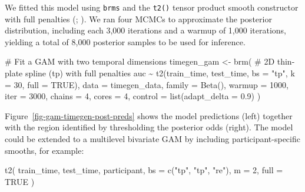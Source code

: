 \documentclass[
  doc,
  floatsintext,
  longtable,
  a4paper,
  nolmodern,
  notxfonts,
  notimes,
  colorlinks=true,linkcolor=blue,citecolor=blue,urlcolor=blue]{apa7}
\newenvironment{Shaded}{\begin{snugshade}}{\end{snugshade}}
\newcommand{\AttributeTok}[1]{\textcolor[rgb]{0.40,0.45,0.13}{#1}}
\newcommand{\CommentTok}[1]{\textcolor[rgb]{0.37,0.37,0.37}{#1}}
\newcommand{\ConstantTok}[1]{\textcolor[rgb]{0.56,0.35,0.01}{#1}}
\newcommand{\DecValTok}[1]{\textcolor[rgb]{0.68,0.00,0.00}{#1}}
\newcommand{\FloatTok}[1]{\textcolor[rgb]{0.68,0.00,0.00}{#1}}
\newcommand{\FunctionTok}[1]{\textcolor[rgb]{0.28,0.35,0.67}{#1}}
\newcommand{\NormalTok}[1]{\textcolor[rgb]{0.00,0.23,0.31}{#1}}
\newcommand{\OtherTok}[1]{\textcolor[rgb]{0.00,0.23,0.31}{#1}}
\newcommand{\SpecialCharTok}[1]{\textcolor[rgb]{0.37,0.37,0.37}{#1}}
\newcommand{\StringTok}[1]{\textcolor[rgb]{0.13,0.47,0.30}{#1}}
\begin{document}
\setlength{\parindent}{0pt}
\setlength{\parskip}{6pt}

We fitted this model using \texttt{brms} and the \texttt{t2()} tensor
product smooth constructor with full penalties
(;
). We ran four MCMCs to approximate
the posterior distribution, including each 3,000 iterations and a warmup
of 1,000 iterations, yielding a total of 8,000 posterior samples to be
used for inference.

\begin{Shaded}
\begin{Highlighting}[]
\CommentTok{\# Fit a GAM with two temporal dimensions}
\NormalTok{timegen\_gam }\OtherTok{\textless{}{-}} \FunctionTok{brm}\NormalTok{(}
    \CommentTok{\# 2D thin{-}plate spline (tp) with full penalties}
\NormalTok{    auc }\SpecialCharTok{\textasciitilde{}} \FunctionTok{t2}\NormalTok{(train\_time, test\_time, }\AttributeTok{bs =} \StringTok{"tp"}\NormalTok{, }\AttributeTok{k =} \DecValTok{30}\NormalTok{, }\AttributeTok{full =} \ConstantTok{TRUE}\NormalTok{),}
    \AttributeTok{data =}\NormalTok{ timegen\_data,}
    \AttributeTok{family =} \FunctionTok{Beta}\NormalTok{(),}
    \AttributeTok{warmup =} \DecValTok{1000}\NormalTok{,}
    \AttributeTok{iter =} \DecValTok{3000}\NormalTok{,}
    \AttributeTok{chains =} \DecValTok{4}\NormalTok{,}
    \AttributeTok{cores =} \DecValTok{4}\NormalTok{,}
    \AttributeTok{control =} \FunctionTok{list}\NormalTok{(}\AttributeTok{adapt\_delta =} \FloatTok{0.9}\NormalTok{)}
\NormalTok{    )}
\end{Highlighting}
\end{Shaded}

\setlength{\parindent}{0pt}
\setlength{\parskip}{6pt}

Figure~\ref{fig-gam-timegen-post-preds} shows the model predictions
(left) together with the region identified by thresholding the posterior
odds (right). The model could be extended to a multilevel bivariate GAM
by including participant-specific smooths, for example:

\begin{Shaded}
\begin{Highlighting}[]
\FunctionTok{t2}\NormalTok{(}
\NormalTok{    train\_time,}
\NormalTok{    test\_time,}
\NormalTok{    participant,}
    \AttributeTok{bs =} \FunctionTok{c}\NormalTok{(}\StringTok{"tp"}\NormalTok{, }\StringTok{"tp"}\NormalTok{, }\StringTok{"re"}\NormalTok{),}
    \AttributeTok{m =} \DecValTok{2}\NormalTok{,}
    \AttributeTok{full =} \ConstantTok{TRUE}
\NormalTok{    )}
\end{Highlighting}
\end{Shaded}
\end{document}
